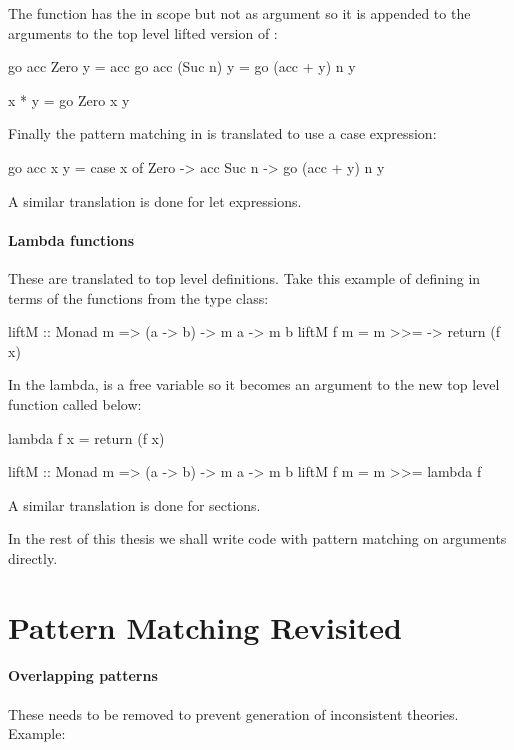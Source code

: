\noindent
The  function has the  in scope but not as argument so it
is appended to the arguments to the top level lifted version of :

\begin{code}
go acc Zero    y = acc
go acc (Suc n) y = go (acc + y) n y

x * y = go Zero x y
\end{code}

\noindent
Finally the pattern matching in  is translated to use a case expression:

\begin{code}
go acc x y = case x of
     Zero  -> acc
     Suc n -> go (acc + y) n y
\end{code}

A similar translation is done for let expressions.

\paragraph{Lambda functions} These are translated to top level
definitions. Take this example of defining  in terms of the
functions from the  type class:

\begin{code}
liftM :: Monad m => (a -> b) -> m a -> m b
liftM f m = m >>= \x -> return (f x)
\end{code}

\noindent
In the lambda,  is a free variable so it becomes an argument to
the new top level function called  below:

\begin{code}
lambda f x = return (f x)

liftM :: Monad m => (a -> b) -> m a -> m b
liftM f m = m >>= lambda f
\end{code}

A similar translation is done for sections.

In the rest of this thesis we shall write code with pattern matching
on arguments directly.

\section{Pattern Matching Revisited}
\label{sec:patternsrevisited}

\paragraph{Overlapping patterns} These needs to be removed to prevent
generation of inconsistent theories. Example:

